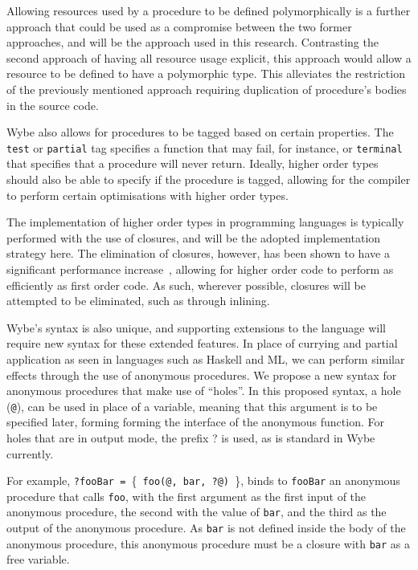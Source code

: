 Allowing resources used by a procedure to be defined polymorphically is a further approach that could be used as a compromise between the two former approaches, and will be the approach used in this research. Contrasting the second approach of having all resource usage explicit, this approach would allow a resource to be defined to have a polymorphic type. This alleviates the restriction of the previously mentioned approach requiring duplication of procedure's bodies in the source code.

Wybe also allows for procedures to be tagged based on certain properties. The \texttt{test} or \texttt{partial} tag specifies a function that may fail, for instance, or \texttt{terminal} that specifies that a procedure will never return. Ideally, higher order types should also be able to specify if the procedure is tagged, allowing for the compiler to perform certain optimisations with higher order types.

The implementation of higher order types in programming languages is typically performed with the use of closures, and will be the adopted implementation strategy here. The elimination of closures, however, has been shown to have a significant performance increase~\cite{leissa2015graph}, allowing for higher order code to perform as efficiently as first order code. As such, wherever possible, closures will be attempted to be eliminated, such as through inlining.

Wybe's syntax is also unique, and supporting extensions to the language will require new syntax for these extended features. In place of currying and partial application as seen in languages such as Haskell and ML, we can perform similar effects through the use of anonymous procedures. We propose a new syntax for anonymous procedures that make use of ``holes''. In this proposed syntax, a hole (\texttt{@}), can be used in place of a variable, meaning that this argument is to be specified later, forming forming the interface of the anonymous function. For holes that are in output mode, the prefix {?} is used, as is standard in Wybe currently. 

For example, \texttt{?fooBar = }\{\texttt{ foo(@, bar, ?@) }\}, binds to \texttt{fooBar} an anonymous procedure that calls \texttt{foo}, with the first argument as the first input of the anonymous procedure, the second with the value of \texttt{bar}, and the third as the output of the anonymous procedure. As \texttt{bar} is not defined inside the body of the anonymous procedure, this anonymous procedure must be a closure with \texttt{bar} as a free variable.

